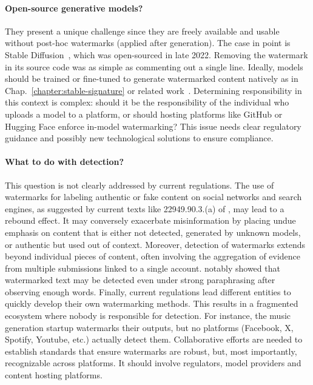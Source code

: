 \paragraph*{Open-source generative models?}
They present a unique challenge since they are freely available and usable without post-hoc watermarks (applied after generation).
The case in point is Stable Diffusion~\citep{rombach2022high}, which was open-sourced in late 2022. 
Removing the watermark in its source code was as simple as commenting out a single line.
Ideally, models should be trained or fine-tuned to generate watermarked content natively as in Chap.~\ref{chapter:stable-signature} or related work~\citep{yu2020responsible, kim2023wouaf, juvela2023collaborative, gu2023learnability}.
Determining responsibility in this context is complex: should it be the responsibility of the individual who uploads a model to a platform, or should hosting platforms like GitHub or Hugging Face enforce in-model watermarking? 
This issue needs clear regulatory guidance and possibly new technological solutions to ensure compliance.

\paragraph*{What to do with detection?}
This question is not clearly addressed by current regulations.
The use of watermarks for labeling authentic or fake content on social networks and search engines, as suggested by current texts like 22949.90.3.(a) of \cite{ca_ab3211_2024}, may lead to a rebound effect. 
It may conversely exacerbate misinformation by placing undue emphasis on content that is either not detected, generated by unknown models, or authentic but used out of context.
Moreover, detection of watermarks extends beyond individual pieces of content, often involving the aggregation of evidence from multiple submissions linked to a single account. 
\citet{kirchenbauer2024on} notably showed that watermarked text may be detected even under strong paraphrasing after observing enough words.
Finally, current regulations lead different entities to quickly develop their own watermarking methods.
This results in a fragmented ecosystem where nobody is responsible for detection.
For instance, the music generation startup \citet{sunov3} watermarks their outputs, but no platforms (Facebook, X, Spotify, Youtube, etc.) actually detect them.
Collaborative efforts are needed to establish standards that ensure watermarks are robust, but, most importantly, recognizable across platforms.
It should involve regulators, model providers and content hosting platforms.









